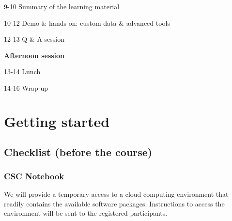 \documentclass[
  oneside]{book}
\begin{document}
9-10 Summary of the learning material

10-12 Demo \& hands-on: custom data \& advanced tools

12-13 Q \& A session

\textbf{Afternoon session}

13-14 Lunch

14-16 Wrap-up

\hypertarget{start}{%
\chapter{Getting started}\label{start}}

\hypertarget{checklist-before-the-course}{%
\section{Checklist (before the course)}\label{checklist-before-the-course}}

\hypertarget{csc-notebook}{%
\subsection{CSC Notebook}\label{csc-notebook}}

We will provide a temporary access to a cloud computing environment
that readily contains the available software packages. Instructions to access
the environment will be sent to the registered participants.
\end{document}
